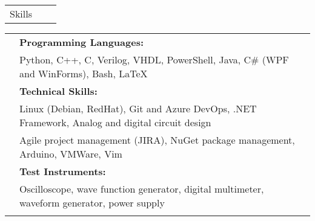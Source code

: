\documentclass[letterpaper,10pt,oneside]{article}
\begin{document}
 \noindent \begin{tabularx}{\linewidth}{@{} l l R } 
     \Large{Skills}\\
 \end{tabularx}
 \noindent \begin{tabularx}{\linewidth}{@{} l l l }
     &\textbf{Programming Languages:}\\
     &Python, C++, C, Verilog, VHDL, PowerShell, Java, C\# (WPF and WinForms), Bash, \LaTeX \\
     &\textbf{Technical Skills:}\\
     &Linux (Debian, RedHat), Git and Azure DevOps, .NET Framework, Analog and digital circuit design\\
     &Agile project management (JIRA), NuGet package management, Arduino, VMWare, Vim\\
     &\textbf{Test Instruments:}\\
     &Oscilloscope, wave function generator, digital multimeter, waveform generator, power supply\\
     \\
 \end{tabularx}
\end{document}
